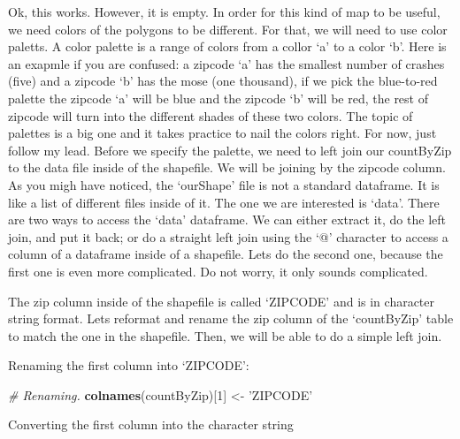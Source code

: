 \documentclass[]{book}
\newenvironment{Shaded}{\begin{snugshade}}{\end{snugshade}}
\newcommand{\CommentTok}[1]{\textcolor[rgb]{0.56,0.35,0.01}{\textit{#1}}}
\newcommand{\DecValTok}[1]{\textcolor[rgb]{0.00,0.00,0.81}{#1}}
\newcommand{\KeywordTok}[1]{\textcolor[rgb]{0.13,0.29,0.53}{\textbf{#1}}}
\newcommand{\NormalTok}[1]{#1}
\newcommand{\OperatorTok}[1]{\textcolor[rgb]{0.81,0.36,0.00}{\textbf{#1}}}
\newcommand{\StringTok}[1]{\textcolor[rgb]{0.31,0.60,0.02}{#1}}
\begin{document}
Ok, this works. However, it is empty. In order for this kind of map to be useful, we need colors of the polygons to be different. For that, we will need to use color paletts. A color palette is a range of colors from a collor `a' to a color `b'. Here is an exapmle if you are confused: a zipcode `a' has the smallest number of crashes (five) and a zipcode `b' has the mose (one thousand), if we pick the blue-to-red palette the zipcode `a' will be blue and the zipcode `b' will be red, the rest of zipcode will turn into the different shades of these two colors. The topic of palettes is a big one and it takes practice to nail the colors right. For now, just follow my lead. Before we specify the palette, we need to left join our countByZip to the data file inside of the shapefile. We will be joining by the zipcode column. As you migh have noticed, the `ourShape' file is not a standard dataframe. It is like a list of different files inside of it. The one we are interested is `data'. There are two ways to access the `data' dataframe. We can either extract it, do the left join, and put it back; or do a straight left join using the `@' character to access a column of a dataframe inside of a shapefile. Lets do the second one, because the first one is even more complicated. Do not worry, it only sounds complicated.

The zip column inside of the shapefile is called `ZIPCODE' and is in character string format. Lets reformat and rename the zip column of the `countByZip' table to match the one in the shapefile. Then, we will be able to do a simple left join.

Renaming the first column into `ZIPCODE':

\begin{Shaded}
\begin{Highlighting}[]
\CommentTok{# Renaming.}
\KeywordTok{colnames}\NormalTok{(countByZip)[}\DecValTok{1}\NormalTok{] <-}\StringTok{ 'ZIPCODE'}
\end{Highlighting}
\end{Shaded}

Converting the first column into the character string

\begin{Shaded}
\end{Shaded}
\end{document}
